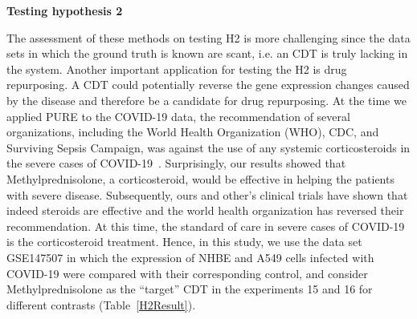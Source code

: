 \documentclass[Minh_PhD_thesis.tex]{subfiles}
\begin{document}
\textbf{Testing hypothesis 2}


The assessment of these methods on testing H2 is more challenging since the data sets in which the ground truth is known are scant, i.e. an CDT is truly lacking in the system. Another important application for testing the H2 is drug repurposing. A CDT could potentially reverse the  gene expression changes caused by the disease and therefore be a candidate for drug repurposing. 
At the time we applied PURE to the COVID-19 data, the recommendation of several organizations, including the World Health Organization (WHO), CDC, and Surviving Sepsis Campaign, was against the use of any systemic corticosteroids in the severe cases of COVID-19~\cite{wilson2020covid}. Surprisingly, our results showed that Methylprednisolone, a corticosteroid, would be effective in helping the patients with severe disease\cite{DraghiciCOVID:2021}. Subsequently, ours and other's clinical trials have shown that indeed steroids are effective and the world health organization has reversed their recommendation\cite{meduri2020pharmacological, corral2021methylprednisolone,salton2020prolonged, meduri2020pharmacological, cochrane1996systemic, prescott2020corticosteroids}. At this time, the standard of care in severe cases of COVID-19 is the corticosteroid treatment. 
Hence, in this study, we use the data set GSE147507 in which the expression of NHBE and A549 cells infected with COVID-19 were compared with their corresponding control, and consider Methylprednisolone as the ``target'' CDT in the experiments 15 and 16 for different contrasts (Table~\ref{H2Result}).
\end{document}
